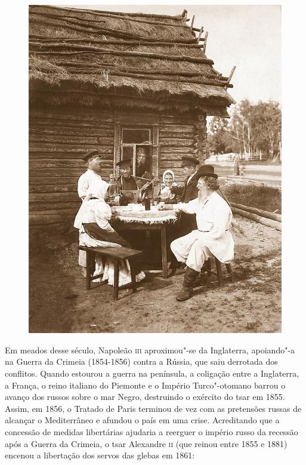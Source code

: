 \documentclass{article}
\begin{document}
\begin{figure}[ht!]
\includegraphics[width=\textwidth]{./images/PNLD0049-12.png}
\end{figure}

Em meados desse século, Napoleão \textsc{iii} aproximou"-se da Inglaterra,
apoiando"-a na Guerra da Crimeia (1854-1856) contra a Rússia, que saiu
derrotada dos conflitos. Quando estourou a guerra na península, a
coligação entre a Inglaterra, a França, o reino italiano do Piemonte e o
Império Turco"-otomano barrou o avanço dos russos sobre o mar Negro,
destruindo o exército do tsar em 1855. Assim, em 1856, o Tratado de
Paris terminou de vez com as pretensões russas de alcançar o
Mediterrâneo e afundou o país em uma crise. Acreditando que a concessão
de medidas libertárias ajudaria a reerguer o império russo da recessão
após a Guerra da Crimeia, o tsar Alexandre \textsc{ii} (que reinou entre 1855 e
1881) encenou a libertação dos servos das glebas em 1861:
\end{document}
